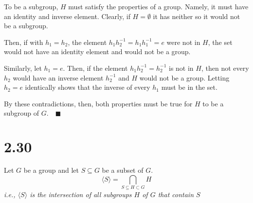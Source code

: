 \documentclass[12pt]{article}
\newcommand{\qed}{\quad \blacksquare}
\newcommand{\brak}[1]{\langle #1 \rangle}
\begin{document}
\color{blue}
    To be a subgroup, $H$ must satisfy the properties of a group. Namely, it must have an identity and inverse element. Clearly, if $H = \emptyset$ it has neither so it would not be a subgroup. 

    Then, if with $h_1 = h_2$, the element $h_1 h_2^{-1} = h_1 h_1^{-1} = e$ were not in $H$, the set would not have an identity element and would not be a group.

    Similarly, let $h_1 = e$. Then, if the element $h_1 h_2^{-1} = h_2^{-1}$ is not in $H$, then not every $h_2$ would have an inverse element $h_2^{-1}$ and $H$ would not be a group. Letting $h_2 = e$ identically shows that the inverse of every $h_1$ must be in the set. 

    By these contradictions, then, both properties must be true for $H$ to be a subgroup of $G. \qed$
\color{black}
\pagebreak

\section*{2.30}
Let $G$ be a group and let $S \subseteq G$ be a subset of $G$. 
\[\brak{S} = \bigcap_{S \subseteq H \subset G} H\]
\emph{i.e., $\brak{S}$ is the intersection of all subgroups $H$ of $G$ that contain $S$}
\end{document}
